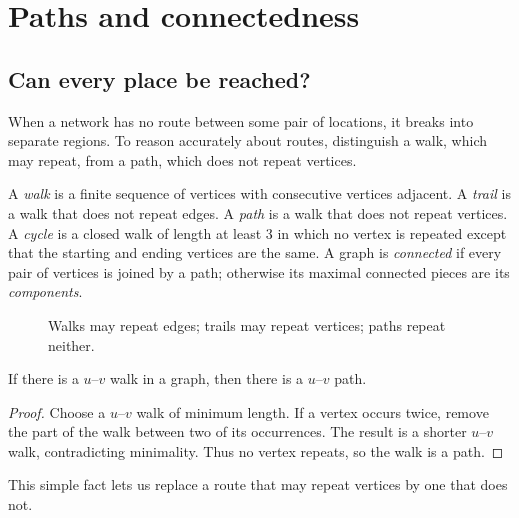 \chapter{Paths and connectedness}
\section*{Can every place be reached?}
When a network has no route between some pair of locations, it breaks into separate regions. To reason accurately about routes, distinguish a walk, which may repeat, from a path, which does not repeat vertices.

\begin{definition}
A \emph{walk} is a finite sequence of vertices with consecutive vertices adjacent. A \emph{trail} is a walk that does not repeat edges. A \emph{path} is a walk that does not repeat vertices. A \emph{cycle} is a closed walk of length at least 3 in which no vertex is repeated except that the starting and ending vertices are the same. A graph is \emph{connected} if every pair of vertices is joined by a path; otherwise its maximal connected pieces are its \emph{components}.
\end{definition}

\begin{figure}[htbp]
\centering
{}
\caption{Walks may repeat edges; trails may repeat vertices; paths repeat neither.}
\end{figure}

\begin{theorem}
If there is a $u$--$v$ walk in a graph, then there is a $u$--$v$ path.
\end{theorem}
\begin{proof}
Choose a $u$--$v$ walk of minimum length. If a vertex occurs twice, remove the part of the walk between two of its occurrences. The result is a shorter $u$--$v$ walk, contradicting minimality. Thus no vertex repeats, so the walk is a path.
\end{proof}
This simple fact lets us replace a route that may repeat vertices by one that does not.


